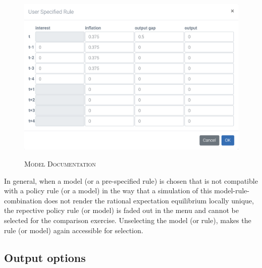 \begin{figure}[H]
	\centering
	\caption{\textsc{Model Documentation}}
	\vspace{0.2cm}
	\includegraphics[width=15cm,keepaspectratio]{userrule.png}\\
	\label{userrule}
\end{figure}

In general, when a model (or a pre-specified rule) is chosen that is not compatible with a policy rule (or a model) in the way that a simulation of this model-rule-combination does not render the rational expectation equilibrium locally unique, the repective policy rule (or model) is faded out in the menu and cannot be selected for the comparison exercise. Unselecting the model (or rule), makes the rule (or model) again accessible for selection. 

\subsection*{Output options}

